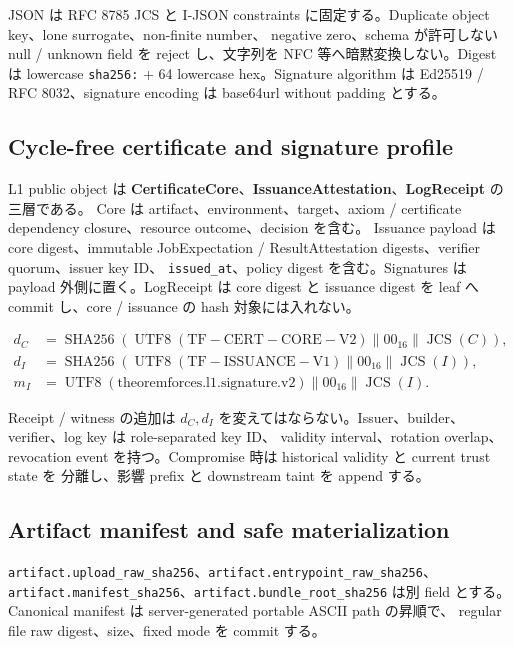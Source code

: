 \documentclass[a4paper,11pt]{ltjsarticle}
\newcommand{\term}[1]{\textbf{\color{TFNavy}#1}}
\newcommand{\code}[1]{\texttt{#1}}
\begin{document}
JSON は RFC 8785 JCS と I-JSON constraints に固定する。Duplicate object key、lone surrogate、non-finite number、
negative zero、schema が許可しない null / unknown field を reject し、文字列を NFC 等へ暗黙変換しない。Digest は
lowercase \code{sha256:} + 64 lowercase hex。Signature algorithm は Ed25519 / RFC 8032、signature encoding は
base64url without padding とする\cite{rfc8785,rfc8032}。

\subsection{Cycle-free certificate and signature profile}

L1 public object は \term{CertificateCore}、\term{IssuanceAttestation}、\term{LogReceipt} の三層である。
Core は artifact、environment、target、axiom / certificate dependency closure、resource outcome、decision を含む。
Issuance payload は core digest、immutable JobExpectation / ResultAttestation digests、verifier quorum、issuer key ID、
\code{issued\_at}、policy digest を含む。Signatures は payload 外側に置く。LogReceipt は core digest と issuance digest を leaf
へ commit し、core / issuance の hash 対象には入れない。

\begin{align}
d_C &= \operatorname{SHA256}(\operatorname{UTF8}(\mathrm{TF\!\! -\! CERT\!\! -\! CORE\!\! -\! V2})\parallel 00_{16}\parallel\operatorname{JCS}(C)),\\
d_I &= \operatorname{SHA256}(\operatorname{UTF8}(\mathrm{TF\!\! -\! ISSUANCE\!\! -\! V1})\parallel 00_{16}\parallel\operatorname{JCS}(I)),\\
m_I &= \operatorname{UTF8}(\mathrm{theoremforces.l1.signature.v2})\parallel 00_{16}\parallel\operatorname{JCS}(I).
\end{align}

Receipt / witness の追加は $d_C,d_I$ を変えてはならない。Issuer、builder、verifier、log key は role-separated key ID、
validity interval、rotation overlap、revocation event を持つ。Compromise 時は historical validity と current trust state を
分離し、影響 prefix と downstream taint を append する。

\subsection{Artifact manifest and safe materialization}

\code{artifact.upload\_raw\_sha256}、\code{artifact.entrypoint\_raw\_sha256}、\\
\code{artifact.manifest\_sha256}、\code{artifact.bundle\_root\_sha256} は別 field とする。Canonical manifest は server-generated portable ASCII path の昇順で、
regular file raw digest、size、fixed mode を commit する。
\end{document}
